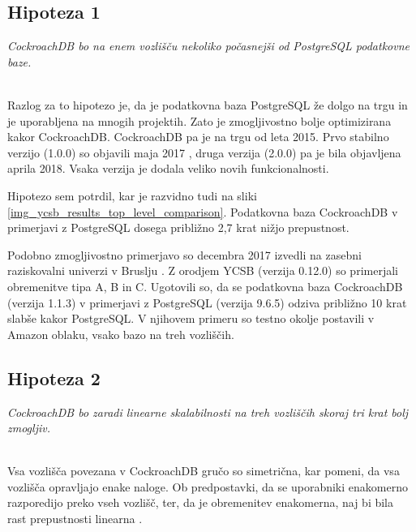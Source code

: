 \documentclass[a4paper, 12pt]{book}
\begin{document}
\subsection{Hipoteza 1}
\textit{CockroachDB bo na enem vozlišču nekoliko počasnejši od PostgreSQL podatkovne baze.}

\ \\
Razlog za to hipotezo je, da je podatkovna baza PostgreSQL že dolgo na trgu \cite{Postgres-first-release} in je uporabljena na mnogih projektih. Zato je zmogljivostno bolje optimizirana kakor CockroachDB. CockroachDB pa je na trgu od leta 2015. Prvo stabilno verzijo (1.0.0) so objavili maja 2017 \cite{CRDB-2017}, druga verzija (2.0.0) pa je bila objavljena aprila 2018. Vsaka verzija je dodala veliko novih funkcionalnosti.


Hipotezo sem potrdil, kar je razvidno tudi na sliki \ref{img_ycsb_results_top_level_comparison}. Podatkovna baza CockroachDB v primerjavi z PostgreSQL dosega približno 2,7 krat nižjo prepustnost.

Podobno zmogljivostno primerjavo so decembra 2017 izvedli na zasebni raziskovalni univerzi v Bruslju \cite{CRDB-2017}. Z orodjem YCSB (verzija 0.12.0) so primerjali obremenitve tipa A, B in C. Ugotovili so, da se podatkovna baza CockroachDB (verzija 1.1.3) v primerjavi z PostgreSQL (verzija 9.6.5) odziva približno 10 krat slabše kakor PostgreSQL. V njihovem primeru so testno okolje postavili v Amazon oblaku, vsako bazo na treh vozliščih.

\subsection{Hipoteza 2}
\textit{CockroachDB bo zaradi linearne skalabilnosti na treh vozliščih skoraj tri krat bolj zmogljiv.}

\ \\
Vsa vozlišča povezana v CockroachDB gručo so simetrična, kar pomeni, da vsa vozlišča opravljajo enake naloge. Ob predpostavki, da se uporabniki enakomerno razporedijo preko vseh vozlišč, ter, da je obremenitev enakomerna, naj bi bila rast prepustnosti linearna \cite{CRDB-design}.
\end{document}
